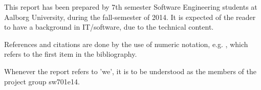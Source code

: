 This report has been prepared by 7th semester Software Engineering students at Aalborg University, during the fall-semester of 2014.
It is expected of the reader to have a background in IT/software, due to the technical content.

References and citations are done by the use of numeric notation, e.g. \cite{aalborgbycyklenbagcyklen}, which refers to the first item in the bibliography.

Whenever the report refers to 'we', it is to be understood as the members of the project group sw701e14.